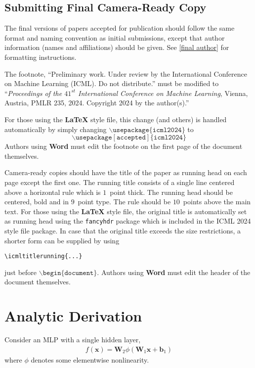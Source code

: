 \documentclass{article}
\theoremstyle{plain}
\theoremstyle{definition}
\theoremstyle{remark}
\newcommand{\xx}{\boldsymbol{x}}
\begin{document}
\subsection{Submitting Final Camera-Ready Copy}

The final versions of papers accepted for publication should follow the
same format and naming convention as initial submissions, except that
author information (names and affiliations) should be given. See
\cref{final author} for formatting instructions.

The footnote, ``Preliminary work. Under review by the International
Conference on Machine Learning (ICML). Do not distribute.'' must be
modified to ``\textit{Proceedings of the
$\mathit{41}^{st}$ International Conference on Machine Learning},
Vienna, Austria, PMLR 235, 2024.
Copyright 2024 by the author(s).''

For those using the \textbf{\LaTeX} style file, this change (and others) is
handled automatically by simply changing
$\mathtt{\backslash usepackage\{icml2024\}}$ to
$$\mathtt{\backslash usepackage[accepted]\{icml2024\}}$$
Authors using \textbf{Word} must edit the
footnote on the first page of the document themselves.

Camera-ready copies should have the title of the paper as running head
on each page except the first one. The running title consists of a
single line centered above a horizontal rule which is $1$~point thick.
The running head should be centered, bold and in $9$~point type. The
rule should be $10$~points above the main text. For those using the
\textbf{\LaTeX} style file, the original title is automatically set as running
head using the \texttt{fancyhdr} package which is included in the ICML
2024 style file package. In case that the original title exceeds the
size restrictions, a shorter form can be supplied by using

\verb|\icmltitlerunning{...}|

just before $\mathtt{\backslash begin\{document\}}$.
Authors using \textbf{Word} must edit the header of the document themselves.

\section{Analytic Derivation}

Consider an MLP with a single hidden layer,
\begin{align}
    f(\xx) = \mathbf{W}_2\phi(\mathbf{W}_1\xx + \mathbf{b}_1)
\end{align}
where $\phi$ denotes some elementwise nonlinearity.
\end{document}
